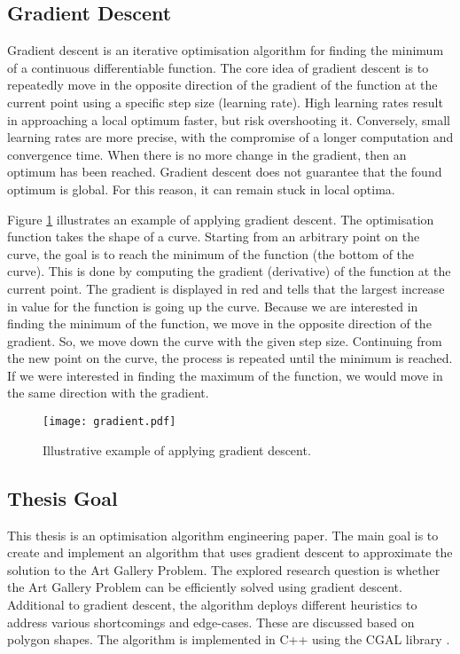 \newpage
\subsection{Gradient Descent}

Gradient descent is an iterative optimisation algorithm for finding the minimum of a continuous differentiable function. The core idea of gradient descent is to repeatedly move in the opposite direction of the gradient of the function at the current point using a specific step size (learning rate). High learning rates result in approaching a local optimum faster, but risk overshooting it. Conversely, small learning rates are more precise, with the compromise of a longer computation and convergence time.
When there is no more change in the gradient, then an optimum has been reached. Gradient descent does not guarantee that the found optimum is global. For this reason, it can remain stuck in local optima.

Figure \ref{fig:gradient_descent} illustrates an example of applying gradient descent. The optimisation function takes the shape of a curve. Starting from an arbitrary point on the curve, the goal is to reach the minimum of the function (the bottom of the curve). This is done by computing the gradient (derivative) of the function at the current point. The gradient is displayed in red and tells that the largest increase in value for the function is going up the curve. Because we are interested in finding the minimum of the function, we move in the opposite direction of the gradient. So, we move down the curve with the given step size. Continuing from the new point on the curve, the process is repeated until the minimum is reached.
If we were interested in finding the maximum of the function, we would move in the same direction with the gradient.

\begin{figure}[h!]
    \centering
    \texttt{[image: gradient.pdf]}
    \caption{Illustrative example of applying gradient descent.}
    \label{fig:gradient_descent}
\end{figure}

\subsection{Thesis Goal}
This thesis is an optimisation algorithm engineering paper. The main goal is to create and implement an algorithm that uses gradient descent to approximate the solution to the Art Gallery Problem. The explored research question is whether the Art Gallery Problem can be efficiently solved using gradient descent. Additional to gradient descent, the algorithm deploys different heuristics to address various shortcomings and edge-cases. These are discussed based on polygon shapes.
The algorithm is implemented in C++ using the CGAL library \cite{cgal}.

